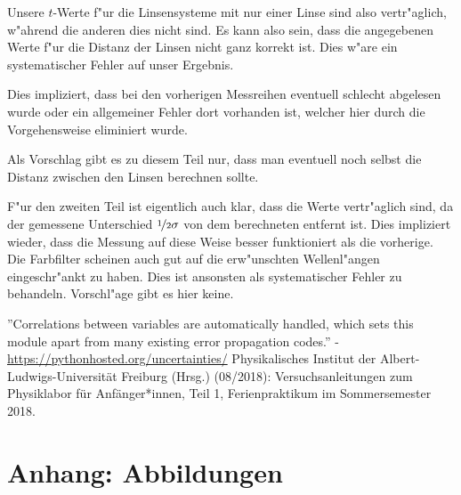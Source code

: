 \documentclass[11pt,a4paper]{article}
\begin{document}
Unsere $t$-Werte f"ur die Linsensysteme mit nur einer Linse sind also vertr"aglich, w"ahrend die anderen dies nicht sind. Es kann also sein, dass die angegebenen Werte f"ur die Distanz der Linsen nicht ganz korrekt ist. Dies w"are ein systematischer Fehler auf unser Ergebnis.

Dies impliziert, dass bei den vorherigen Messreihen eventuell schlecht abgelesen wurde oder ein allgemeiner Fehler dort vorhanden ist, welcher hier durch die Vorgehensweise eliminiert wurde.

Als Vorschlag gibt es zu diesem Teil nur, dass man eventuell noch selbst die Distanz zwischen den Linsen berechnen sollte.

F"ur den zweiten Teil ist eigentlich auch klar, dass die Werte vertr"aglich sind, da der gemessene Unterschied $\nicefrac{1}{2}\sigma$ von dem berechneten entfernt ist. Dies impliziert wieder, dass die Messung auf diese Weise besser funktioniert als die vorherige. Die Farbfilter scheinen auch gut auf die erw"unschten Wellenl"angen eingeschr"ankt zu haben. Dies ist ansonsten als systematischer Fehler zu behandeln. Vorschl"age gibt es hier keine.


\begin{thebibliography}{9}
''Correlations between variables are automatically handled, which sets this module apart from many existing error propagation codes.'' - \url{https://pythonhosted.org/uncertainties/}
 Physikalisches Institut der Albert-Ludwigs-Universität Freiburg (Hrsg.) (08/2018): Versuchsanleitungen zum Physiklabor für Anfänger*innen, Teil 1, Ferienpraktikum im Sommersemester 2018.
\end{thebibliography}

\section{Anhang: Abbildungen}%



\end{document}
